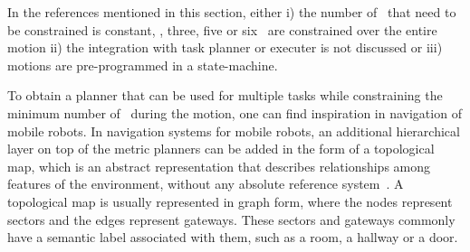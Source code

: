 In the references mentioned in this section, either i) the number of \dofs\ that need to be constrained is constant, \eg, three, five or six \dofs\ are constrained over the entire motion ii) the integration with task planner or executer is not discussed or iii) motions are pre-programmed in a state-machine. 

To obtain a planner that can be used for multiple tasks while constraining the minimum number of \dofs\ during the motion, one can find inspiration in navigation of mobile robots.
In navigation systems for mobile robots, an additional hierarchical layer on top of the metric planners can be added in the form of a topological map, which is an abstract representation that describes relationships among features of the environment, without any absolute reference system~\citep{Zavlangas2002}.
A topological map is usually represented in graph form, where the nodes represent sectors and the edges represent gateways. These sectors and gateways commonly have a semantic label associated with them, such as a room, a hallway or a door.

